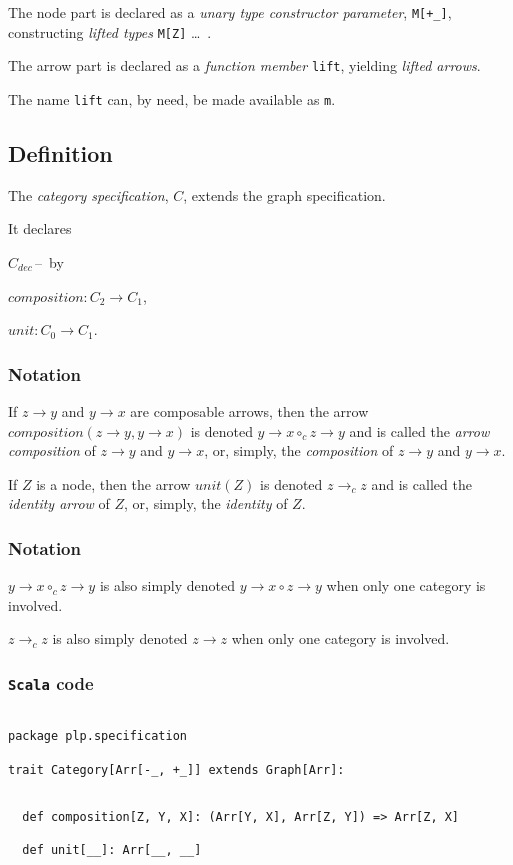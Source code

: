 \documentclass[11pt]{article}
\newcommand{\arrow}[2]{#1\!\!\rightarrow\!\!#2}
\newcommand{\arrowcomposition}[2]{#1 \rightarrow #2}
\newcommand{\arrowunit}[2]{#1 \rightarrow #2}
\newcommand{\idarrow}[3]{#2 \!\rightarrow_{#1}\! #3}
\newcommand{\defn}{\subsection{Definition}\begingroup\rm}
\renewcommand{\not}{\subsubsection{Notation}\begingroup\rm}
\newcommand{\code}{\subsubsection{{\tt Scala} code}\begingroup\rm \vspace{12pt}}
\def\edefn{\endgroup\par\pagebreak[2]\addvspace{\medskipamount}}
\let\enot=\edefn
\let\ecode=\edefn
\newcounter{lister}
\newenvironment{labeledlist}[1]
{\begin{list}{{\rm#1\,--\,\arabic{lister}}}{\usecounter{lister}
\settowidth{\labelwidth}{#1--1}
\leftmargin\labelwidth \advance\leftmargin by \labelsep
}}
{\end{list}}
\def\blist#1{\begin{labeledlist}{#1}\setcounter{lister}{-1}}
\newcommand{\elist}{\end{labeledlist}}
\begin{document}
The node part is declared as a 
{\em unary type constructor parameter}, {\tt M[+\_]}, constructing
{\em lifted types} {\tt M[Z]} \ldots\, . 

The arrow part is declared as a {\em function member} {\tt lift},
yielding {\em lifted arrows}.

The name {\tt lift} can, by need, be made available as {\tt m}.
\ecode

\defn\label{category specification}
The {\em category specification}, $C$, extends the graph specification. 

It declares
\blist{$C_{dec}$}
\item $composition: \arrowcomposition{C_2}{C_1}$,
\item $unit: \arrowunit{C_0}{C_1}$.
\elist
\edefn

\not
If $\arrow{z}{y}$ and $\arrow{y}{x}$ are composable arrows, then the arrow $composition(\arrow{z}{y},\arrow{y}{x})$ is
denoted ${\arrow{y}{x}} \circ_{c} \arrow{z}{y}$ and is called the 
{\em arrow composition} of $\arrow{z}{y}$ and $\arrow{y}{x}$, or, simply,
the {\em composition} of $\arrow{z}{y}$ and $\arrow{y}{x}$. 

If $Z$ is a node, then the arrow $unit(Z)$ is denoted $\idarrow{c}{z}{z}$ and is called the 
{\em identity arrow} of $Z$, or, simply, the 
{\em identity} of $Z$. 
\enot

\not
${\arrow{y}{x}} \circ_{c} \arrow{z}{y}$ is also simply denoted ${\arrow{y}{x}} \circ \arrow{z}{y}$ when only one
category is involved.

$\idarrow{c}{z}{z}$ is also simply denoted $\arrow{z}{z}$ when only one category is involved.
\enot

\code
\begin{mdframed}[backgroundcolor=lightgray!20] 
\begin{lstlisting}

package plp.specification

trait Category[Arr[-_, +_]] extends Graph[Arr]:
\end{lstlisting}
\end{mdframed}
\vspace{6pt}
\begin{mdframed}[backgroundcolor=lightgray!20] 
\begin{lstlisting}

  def composition[Z, Y, X]: (Arr[Y, X], Arr[Z, Y]) => Arr[Z, X]

  def unit[__]: Arr[__, __]
\end{lstlisting}
\end{mdframed}
\end{document}
